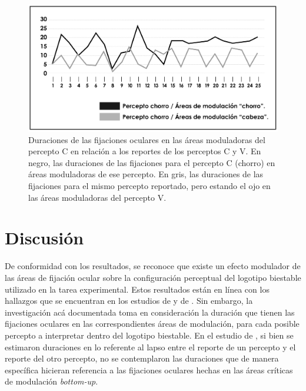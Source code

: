 \documentclass[spanish]{textolivre}
\begin{document}
\begin{figure}
\centering
\begin{minipage}{.75\textwidth}
    \includegraphics[width=\linewidth]{Fig8.jpeg}
    \caption{Duraciones de las fijaciones oculares en las áreas moduladoras del percepto C en relación a los reportes de los perceptos C y V. En negro, las duraciones de las fijaciones para el percepto C (chorro) en áreas moduladoras de ese percepto. En gris, las duraciones de las fijaciones para el mismo percepto reportado, pero estando el ojo en las áreas moduladoras del percepto V.}
    \label{fig8}
\end{minipage}
\end{figure}


\section{Discusión}\label{sec-organizacao}
De conformidad con los resultados, se reconoce que existe un efecto modulador de las áreas de fijación ocular sobre la configuración perceptual del logotipo biestable utilizado en la tarea experimental. Estos resultados están en línea con los hallazgos que se encuentran en los estudios de \textcite{rodriguez_bottom-up_2019} y de \textcite{rodriguez-martinez_can_2024}. Sin embargo, la investigación acá documentada toma en consideración la duración que tienen las fijaciones oculares en las correspondientes áreas de modulación, para cada posible percepto a interpretar dentro del logotipo biestable. En el estudio de \textcite{marroquin-ciendua_modulacion_2020}, si bien se estimaron duraciones en lo referente al lapso entre el reporte de un percepto y el reporte del otro percepto, no se contemplaron las duraciones que de manera específica hicieran referencia a las fijaciones oculares hechas en las áreas críticas de modulación \textit{bottom-up}.
\end{document}
